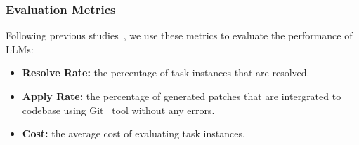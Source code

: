 



\subsubsection{Evaluation Metrics}
Following previous studies~\cite{jimenez2023swe,tao2024magis,xia2024agentless}, we use these metrics to evaluate the performance of LLMs:
\begin{itemize}[left=10pt]
    \item \textbf{Resolve Rate:} the percentage of task instances that are resolved. 
    \item \textbf{Apply Rate:} the percentage of generated patches that are intergrated to codebase using Git~\cite{git} tool without any errors. 
    \item \textbf{Cost:} the average cost of evaluating task instances.
\end{itemize}









